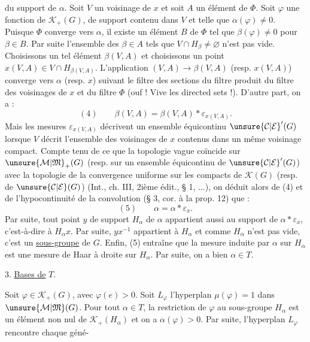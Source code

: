 du support de $\alpha$. Soit $V$ un voisinage de $x$ et soit $A$ un élément de $\Phi$. Soit $\varphi$ une fonction de $\mathcal K_+(G)$, de support contenu dans $V$ et telle que $\alpha(\varphi)\ne 0$. Puisque $\Phi$ converge vers $\alpha$, il existe un élément $B$ de $\Phi$ tel que $\beta(\varphi)\ne 0$ pour $\beta\in B$. Par suite l'ensemble des $\beta\in A$ tels que $V\cap H_\beta\ne\varnothing$ n'est pas vide. Choisissons un tel élément $\beta(V,A)$ et choisissons un point $x(V,A)\in V\cap H_{\beta(V,A)}$. L'application $(V,A)\longrightarrow\beta(V,A)$ (resp. $x(V,A)$) converge vers $\alpha$ (resp. $x$) suivant le filtre des sections du filtre produit du filtre des voisinages de $x$ et du filtre $\Phi$ (ouf ! Vive les directed sets !). D'autre part, on a :
\[
(4)\qquad\beta(V,A)=\beta(V,A)*\varepsilon_{x(V,A)}.
\]
Mais les mesures $\varepsilon_{x(V,A)}$ décrivent un ensemble équicontinu $\unsure{\mathcal C|\mathcal E}'(G)$ lorsque $V$ décrit l'ensemble des voisinages de $x$ contenus dans un même voisinage compact. Compte tenu de ce que la topologie vague coïncide sur $\unsure{\mathcal M|\mathfrak M}_+(G)$ (resp. sur un ensemble équicontinu de $\unsure{\mathcal C|\mathcal E}'(G)$) avec la topologie de la convergence uniforme sur les compacts de $\mathcal K(G)$ (resp. de $\unsure{\mathcal C|\mathcal E}(G)$) (Int., ch. III, 2ième édit., § 1, $\ldots$), on déduit alors de (4) et de l'hypocontinuité de la convolution (§ 3, cor. à la prop. 12) que :
\[
(5)\qquad\alpha=\alpha*\varepsilon_x.
\]
Par suite, tout point $y$ de support $H_\alpha$ de $\alpha$ appartient aussi au support de $\alpha*\varepsilon_x$, c'est-à-dire à $H_\alpha x$. Par suite, $yx^{-1}$ appartient à $H_\alpha$ et comme $H_\alpha$ n'est pas vide, c'est un \uline{sous-groupe} de $G$. Enfin, (5) entraîne que la mesure induite par $\alpha$ sur $H_\alpha$ est une mesure de Haar à droite sur $H_\alpha$. Par suite, on a bien $\alpha\in T$.

3. \uline{Bases de} $T$.

Soit $\varphi\in\mathcal K_+(G)$, avec $\varphi(e)>0$. Soit $L_\varphi$ l'hyperplan $\mu(\varphi)=1$ dans $\unsure{\mathcal M|\mathfrak M}(G)$. Pour tout $\alpha\in T$, la restriction de $\varphi$ au sous-groupe $H_\alpha$ est un élément non nul de $\mathcal K_+(H_\alpha)$ et on a $\alpha(\varphi)>0$. Par suite, l'hyperplan $L_\varphi$ rencontre chaque géné-
